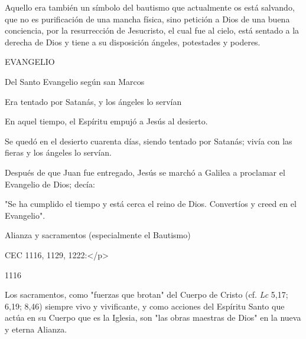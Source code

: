 \begin{readbody}Aquello era también un símbolo del bautismo que actualmente os está salvando, que no es purificación de una mancha física, sino petición a Dios de una buena conciencia, por la resurrección de Jesucristo, el cual fue al cielo, está sentado a la derecha de Dios y tiene a su disposición ángeles, potestades y poderes.\end{readbody}

\begin{readtitle}EVANGELIO\end{readtitle}

\begin{readbook}Del Santo Evangelio según san Marcos \end{readbook}

\begin{readtheme}Era tentado por Satanás, y los ángeles lo servían\end{readtheme}

\begin{readbody}En aquel tiempo, el Espíritu empujó a Jesús al desierto.\end{readbody}

\begin{readbody}Se quedó en el desierto cuarenta días, siendo tentado por Satanás; vivía con las fieras y los ángeles lo servían.\end{readbody}

\begin{readbody}Después de que Juan fue entregado, Jesús se marchó a Galilea a proclamar el Evangelio de Dios; decía:\end{readbody}

\begin{readtalk} "Se ha cumplido el tiempo y está cerca el reino de Dios. Convertíos y creed en el Evangelio".\end{readtalk}


\begin{ccetheme}Alianza y sacramentos (especialmente el Bautismo) \end{ccetheme}

\begin{ccereference}\end{ccereference}CEC 1116, 1129, 1222:</p>

\begin{ccebody}\begin{ccenumber}1116 \end{ccenumber}Los sacramentos, como "fuerzas que brotan" del Cuerpo de Cristo (cf. \textit{Lc} 5,17; 6,19; 8,46) siempre vivo y vivificante, y como acciones del Espíritu Santo que actúa en su Cuerpo que es la Iglesia, son "las obras maestras de Dios" en la nueva y eterna Alianza.\end{ccebody}

